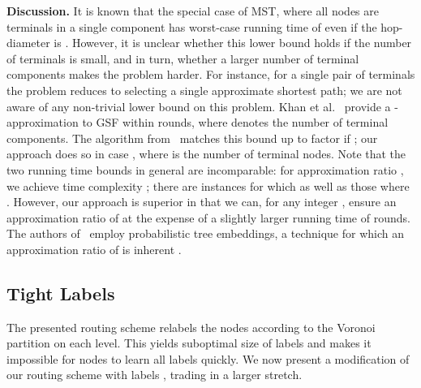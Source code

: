 \documentclass[letterpaper,11pt]{article}
\begin{document}
\noindent\textbf{Discussion.} It is known that the special case of MST, where
all nodes are terminals in a single component has worst-case running time of
 even if the hop-diameter is 
\cite{PelegR-00}. However, it is unclear whether this lower bound holds if the
number of terminals is small, and in turn, whether a larger number of terminal
components makes the problem harder. For instance, for a single pair of
terminals the problem reduces to selecting a single approximate shortest path;
we are not aware of any non-trivial lower bound on this problem. Khan et
al.~\cite{KKMPT} provide a -approximation to GSF within
 rounds, where  denotes the number of
terminal components. The algorithm from~\cite{KKMPT} matches this bound up to factor
 if ; our approach does
so in case , where  is the number of terminal nodes. Note
that the two running time bounds in general are incomparable: for approximation
ratio , we achieve time complexity ;
there are instances for which  as well as those
where . However, our approach is superior in
that we can, for any integer , ensure an approximation ratio of
 at the expense of a slightly larger running time of
 rounds. The authors of~\cite{KKMPT} employ
probabilistic tree embeddings, a technique for which an approximation ratio of
 is inherent \cite{FRK}.

\subsection{Tight Labels}

The presented routing scheme relabels the nodes according to the Voronoi
partition on each level. This yields suboptimal size of labels and makes it
impossible for nodes to learn all labels  quickly. We now
present a modification of our routing scheme with labels
, trading in a larger stretch.
\end{document}
